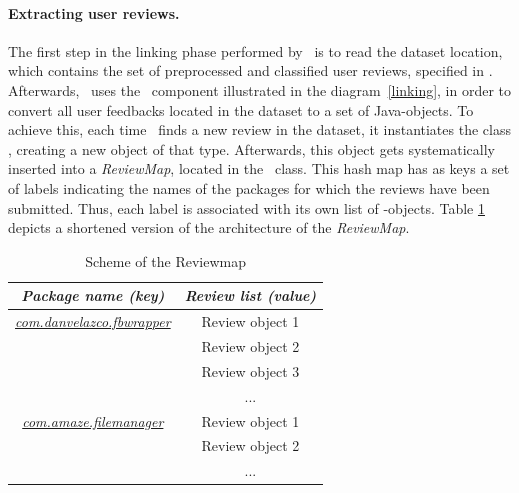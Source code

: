 \paragraph{Extracting user reviews.} 
The first step in the linking phase performed by \toolname\, is to read the dataset location, which contains the set of preprocessed and classified user reviews, specified in \Config.
Afterwards, \toolname\ uses the \ReviewC\ component illustrated in the diagram~\ref{linking}, in order to convert all user feedbacks located in the dataset to a set of Java-objects. 
To achieve this, each time \toolname\ finds a new review in the dataset, it instantiates the class \Review, creating a new object of that type. 
Afterwards, this object gets systematically inserted into a \textit{ReviewMap}, located in the \ReviewC\ class. 
This hash map has as keys a set of labels indicating the names of the packages for which the reviews have been submitted. Thus, each label is associated with its own list of \Review-objects. 
Table \ref{tbl: reviewmap} depicts a shortened version of the architecture of the \textit{ReviewMap}.
\begin{table}[tb]
\centering
\caption{Scheme of the Reviewmap}
\label{tbl: reviewmap}
\begin{tabular}{c|c|}
\hline
\multicolumn{1}{|c|}{\textit{\textbf{Package name (key)}}}    & \textit{\textbf{Review list (value)}} \\ \hline
\multicolumn{1}{|c|}{{\ul \textit{com.danvelazco.fbwrapper}}} & Review object 1                       \\ \hline
                                                              & Review object 2                       \\ \cline{2-2} 
                                                              & Review object 3                       \\ \cline{2-2} 
                                                              & ...                                   \\ \hline
\multicolumn{1}{|c|}{{\ul \textit{com.amaze.filemanager}}}    & Review object 1                       \\ \hline
                                                              & Review object 2                       \\ \cline{2-2} 
                                                              & ...                                   \\ \cline{2-2} 
\end{tabular}
\end{table}

